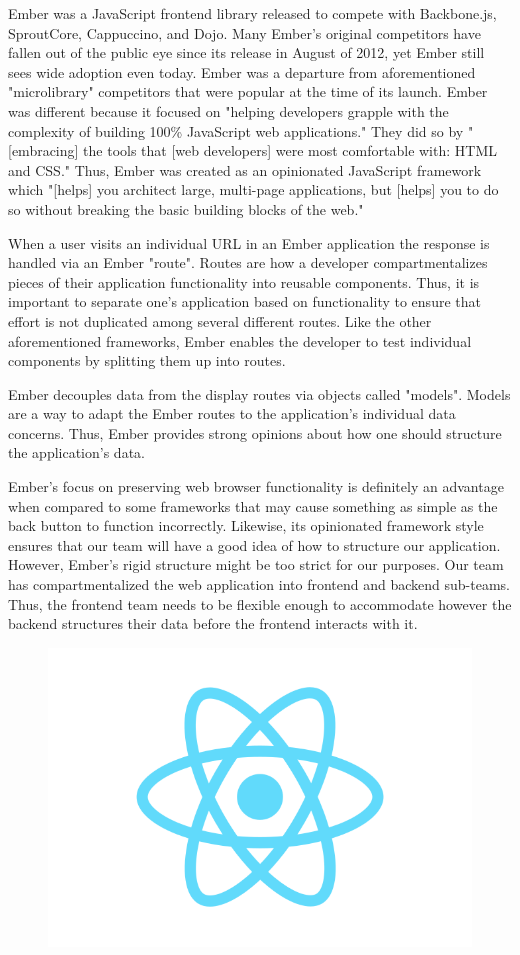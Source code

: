 \documentclass[12pt]{report}
\begin{document}
Ember was a JavaScript frontend library released to compete with Backbone.js, SproutCore, Cappuccino, and Dojo.\cite{emberrelease} Many Ember's original competitors have fallen out of the public eye since its release in August of 2012, yet Ember still sees wide adoption even today. Ember was a departure from aforementioned "microlibrary" competitors that were popular at the time of its launch. Ember was different because it focused on "helping developers grapple with the complexity of building 100\% JavaScript web applications."\cite{emberrelease} They did so by "[embracing] the tools that [web developers] were most comfortable with: HTML and CSS."\cite{emberrelease} Thus, Ember was created as an opinionated JavaScript framework which "[helps] you architect large, multi-page applications, but [helps] you to do so without breaking the basic building blocks of the web."\cite{emberrelease}

When a user visits an individual URL in an Ember application the response is handled via an Ember "route".\cite{emberrouting} Routes are how a developer compartmentalizes pieces of their application functionality into reusable components. Thus, it is important to separate one's application based on functionality to ensure that effort is not duplicated among several different routes. Like the other aforementioned frameworks, Ember enables the developer to test individual components by splitting them up into routes.

Ember decouples data from the display routes via objects called "models".\cite{embermodel} Models are a way to adapt the Ember routes to the application's individual data concerns. Thus, Ember provides strong opinions about how one should structure the application's data.

Ember's focus on preserving web browser functionality is definitely an advantage when compared to some frameworks that may cause something as simple as the back button to function incorrectly. Likewise, its opinionated framework style ensures that our team will have a good idea of how to structure our application. However, Ember's rigid structure might be too strict for our purposes. Our team has compartmentalized the web application into frontend and backend sub-teams. Thus, the frontend team needs to be flexible enough to accommodate however the backend structures their data before the frontend interacts with it.

\begin{figure}[h]
	\centering
	\includegraphics[width=0.25\linewidth]{react}
\end{figure}
\end{document}
